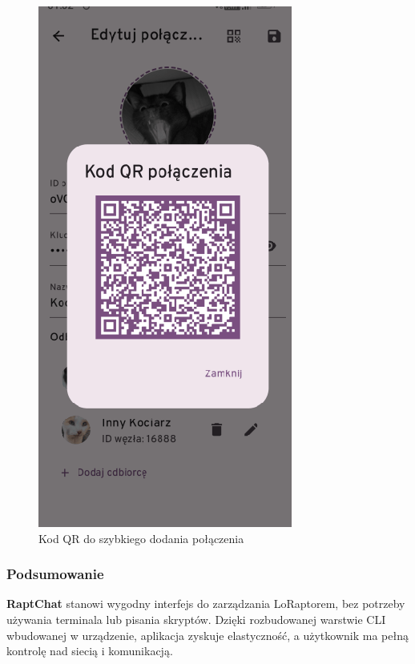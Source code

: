 \begin{figure}[H]
	\centering
	\begin{minipage}[b]{0.45\textwidth}
		\centering
		\includegraphics[width=\textwidth]{root/raptchat_qr.png}
		\caption{Kod QR do szybkiego dodania połączenia}
	\end{minipage}
\end{figure}

\clearpage
\subsubsection{Podsumowanie}

\textbf{RaptChat} stanowi wygodny interfejs do zarządzania LoRaptorem, bez potrzeby używania terminala lub pisania skryptów. Dzięki rozbudowanej warstwie CLI wbudowanej w urządzenie, aplikacja zyskuje elastyczność, a użytkownik ma pełną kontrolę nad siecią i komunikacją.